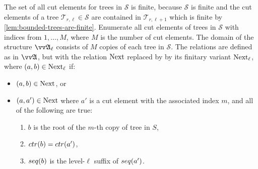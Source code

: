 The set of all cut elements for trees in $\mathcal{S}$ is finite, because $\mathcal{S}$ is finite and the cut elements of a tree $\mathcal{T}_{r,\ell} \in \mathcal{S}$ are contained in $\mathcal{T}_{r,\ell+1}$ which is finite by \cref{lem:bounded-trees-are-finite}.
Enumerate all cut elements of trees in $\mathcal{S}$ with indices from $1, \ldots, M$, where $M$ is the number of cut elements.
The domain of the structure $\unravel{A}_{\ell}$ consists of $M$ copies of each tree in $\mathcal{S}$.
The relations are defined as in $\unravel{A}$, but with the relation $\mathrm{Next}$ replaced by by its finitary variant $\mathrm{Next}_{\ell}$, where $(a,b) \in \mathrm{Next}_{\ell}$ if:
\begin{itemize}
  \item $(a,b) \in \mathrm{Next}$, or
  \item $(a,a') \in \mathrm{Next}$ where $a'$ is a cut element with the associated index $m$, and all of the following are true:
        \begin{enumerate}
          \item $b$ is the root of the $m$-th copy of tree in $S$,
          \item $\ctr{b} = \ctr{a'}$,
          \item $\seq{b}$ is the level-$\ell$ suffix of $\seq{a'}$.
        \end{enumerate}
\end{itemize}

